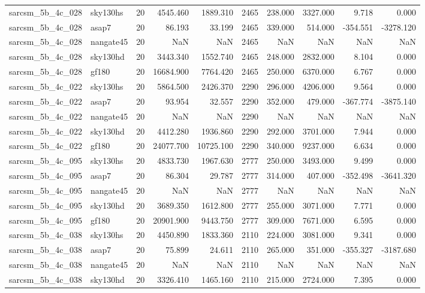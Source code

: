 \begin{longtable}{llrrrrrrrr}
sarcsm\_5b\_4c\_028 & sky130hs & 20 & 4545.460 & 1889.310 & 2465 & 238.000 & 3327.000 & 9.718 & 0.000 \\
sarcsm\_5b\_4c\_028 & asap7 & 20 & 86.193 & 33.199 & 2465 & 339.000 & 514.000 & -354.551 & -3278.120 \\
sarcsm\_5b\_4c\_028 & nangate45 & 20 & NaN & NaN & 2465 & NaN & NaN & NaN & NaN \\
sarcsm\_5b\_4c\_028 & sky130hd & 20 & 3443.340 & 1552.740 & 2465 & 248.000 & 2832.000 & 8.104 & 0.000 \\
sarcsm\_5b\_4c\_028 & gf180 & 20 & 16684.900 & 7764.420 & 2465 & 250.000 & 6370.000 & 6.767 & 0.000 \\
sarcsm\_5b\_4c\_022 & sky130hs & 20 & 5864.500 & 2426.370 & 2290 & 296.000 & 4206.000 & 9.564 & 0.000 \\
sarcsm\_5b\_4c\_022 & asap7 & 20 & 93.954 & 32.557 & 2290 & 352.000 & 479.000 & -367.774 & -3875.140 \\
sarcsm\_5b\_4c\_022 & nangate45 & 20 & NaN & NaN & 2290 & NaN & NaN & NaN & NaN \\
sarcsm\_5b\_4c\_022 & sky130hd & 20 & 4412.280 & 1936.860 & 2290 & 292.000 & 3701.000 & 7.944 & 0.000 \\
sarcsm\_5b\_4c\_022 & gf180 & 20 & 24077.700 & 10725.100 & 2290 & 340.000 & 9237.000 & 6.634 & 0.000 \\
sarcsm\_5b\_4c\_095 & sky130hs & 20 & 4833.730 & 1967.630 & 2777 & 250.000 & 3493.000 & 9.499 & 0.000 \\
sarcsm\_5b\_4c\_095 & asap7 & 20 & 86.304 & 29.787 & 2777 & 314.000 & 407.000 & -352.498 & -3641.320 \\
sarcsm\_5b\_4c\_095 & nangate45 & 20 & NaN & NaN & 2777 & NaN & NaN & NaN & NaN \\
sarcsm\_5b\_4c\_095 & sky130hd & 20 & 3689.350 & 1612.800 & 2777 & 255.000 & 3071.000 & 7.771 & 0.000 \\
sarcsm\_5b\_4c\_095 & gf180 & 20 & 20901.900 & 9443.750 & 2777 & 309.000 & 7671.000 & 6.595 & 0.000 \\
sarcsm\_5b\_4c\_038 & sky130hs & 20 & 4450.890 & 1833.360 & 2110 & 224.000 & 3081.000 & 9.341 & 0.000 \\
sarcsm\_5b\_4c\_038 & asap7 & 20 & 75.899 & 24.611 & 2110 & 265.000 & 351.000 & -355.327 & -3187.680 \\
sarcsm\_5b\_4c\_038 & nangate45 & 20 & NaN & NaN & 2110 & NaN & NaN & NaN & NaN \\
sarcsm\_5b\_4c\_038 & sky130hd & 20 & 3326.410 & 1465.160 & 2110 & 215.000 & 2724.000 & 7.395 & 0.000 \\

\end{longtable}
